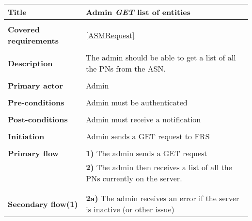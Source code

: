 \documentclass[a4paper,11pt]{article}
\begin{document}
\begin{tabular}{|p{3.5cm}|p{11.5cm}|} \hline
    \textbf{Title} &   Admin \emph{GET} list of entities
        
    \\ \hline \rowcolor{Gray} & \\ \hline
    
                \textbf{Covered requirements} &  \ref{ASMRequest}
        
    \\ \hline \rowcolor{Gray} & \\ \hline
        
    \textbf{Description} &  The admin should be able to get a list of all the PNs from the ASN.
        
    \\ \hline \rowcolor{Gray} & \\ \hline
        
    \textbf{Primary actor} & Admin  
        
    \\ \hline \rowcolor{Gray} & \\ \hline 
          
    \textbf{Pre-conditions} &   Admin must be authenticated
        
    \\ \hline \rowcolor{Gray} & \\ \hline
         
    \textbf{Post-conditions} &   Admin must receive a notification
        
    \\ \hline \rowcolor{Gray} & \\ \hline 
         
    \textbf{Initiation} & Admin sends a GET request to FRS
        
    \\ \hline \rowcolor{Gray} & \\ \hline 
         
    \textbf{Primary flow} & 
    \textbf{1)} The admin sends a GET request \\&
    \textbf{2)} The admin then receives a list of all the PNs currently on the server. \\&
        
    \\ \hline \rowcolor{Gray} & \\ \hline 
         
    \textbf{Secondary flow(1)} & 
    \textbf{2a)} The admin receives an error if the server is inactive (or other issue)
    \\ \hline 
\end{tabular}
\end{document}
